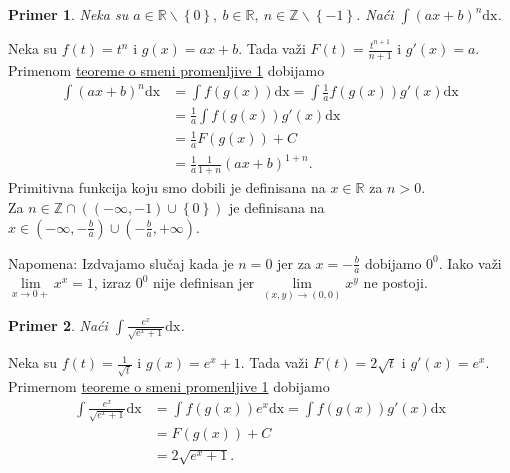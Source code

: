 \documentclass{article}
\newtheorem{prim}{Primer}[section]
\begin{document}
\begin{primbox}
    \label{primer_1.7}
    \begin{prim}
        Neka su $a \in \mathbb{R}\backslash\left\{0\right\},\ b\in\mathbb{R},\ n \in \mathbb{Z}\backslash\left\{-1\right\}$. Naći $\displaystyle\int\left(ax + b\right)^n\text{dx}$.
    \end{prim}
    Neka su $f\left(t\right) = t^n$ i $g\left(x\right) = ax+b$. Tada važi $\displaystyle F\left(t\right) = \frac{t^{n+1}}{n+1}$ i $g'\left(x\right) = a$. Primenom \hyperref[teorema_1.2]{teoreme o smeni promenljive 1} dobijamo
    \begin{align*}
        \int\left(ax + b\right)^n\text{dx} & = \int f\left(g\left(x\right)\right)\text{dx} = \int\frac{1}{a}f\left(g\left(x\right)\right)g'\left(x\right)\text{dx} \\
                                           & = \frac{1}{a}\int f\left(g\left(x\right)\right)g'\left(x\right)\text{dx}                                              \\
                                           & = \frac{1}{a}F\left(g\left(x\right)\right) + C                                                                        \\
                                           & = \frac{1}{a}\frac{1}{1+n}\left(ax + b\right)^{1+n}.
    \end{align*}
    Primitivna funkcija koju smo dobili je definisana na $x \in \mathbb{R}$ za $n > 0$.\\
    Za $n\in \mathbb{Z} \cap \left(\left(-\infty, -1\right)\cup\left\{0\right\}\right)$ je definisana na $\displaystyle x \in \left(-\infty, -\frac{b}{a}\right)\cup\left(-\frac{b}{a}, +\infty\right)$.\par
    Napomena: Izdvajamo slučaj kada je $n=0$ jer za $\displaystyle x=-\frac{b}{a}$ dobijamo $0^0$. Iako važi $\lim\limits_{x\longrightarrow0+}x^x = 1$, izraz
    $0^0$ nije definisan jer $\lim\limits_{\left(x, y\right)\longrightarrow\left(0,0\right)} x^y$ ne postoji.
\end{primbox}

\begin{primbox}
    \label{primer_1.8}
    \begin{prim}
        Naći $\displaystyle\int \frac{e^x}{\sqrt{e^x + 1}}\text{dx}$.
    \end{prim}
    Neka su $\displaystyle f\left(t\right) = \frac{1}{\sqrt{t}}$ i $g\left(x\right) = e^x+1$. Tada važi $F\left(t\right) = 2  \sqrt{t}$ i $g'\left(x\right) = e^x$. Primernom \hyperref[teorema_1.2]{teoreme o smeni promenljive 1}
    dobijamo
    \begin{align*}
        \int\frac{e^x}{\sqrt{e^x + 1}}\text{dx} & = \int f\left(g\left(x\right)\right)e^x\text{dx} = \int f\left(g\left(x\right)\right)g'\left(x\right)\text{dx} \\
                                                & = F\left(g\left(x\right)\right) + C                                                                            \\
                                                & = 2 \sqrt{ e^x+1}.
    \end{align*}
\end{primbox}
\end{document}
